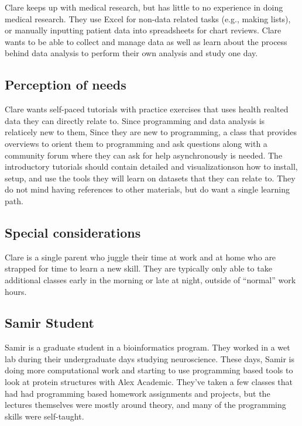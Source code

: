 \documentclass[020-persona\_validation.tex]{subfiles}
\begin{document}
            Clare keeps up with medical research,
            but has little to no experience in doing medical research.
            They use Excel for non-data related tasks (e.g., making lists),
            or manually inputting patient data into spreadsheets for chart reviews.
            Clare wants to be able to collect and manage data as well as
            learn about the process behind data analysis to perform their own analysis and study one day.

        \subsection{Perception of needs}

            Clare wants self-paced tutorials with practice exercises that uses health realted data they can directly relate to.            Since programming and data analysis is relaticely new to them,
            Since they are new to programming,
            a class that provides overviews to orient them to programming and ask questions along with
            a community forum where they can ask for help asynchronously is needed.
            The introductory tutorials should contain detailed and visualizationson how to install, setup, and use
            the tools they will learn on datasets that they can relate to.
            They do not mind having references to other materials,
            but do want a single learning path.

        \subsection{Special considerations}

            Clare is a single parent who juggle their time at work and at home who are strapped for time to learn a new skill.
            They are typically only able to take additional classes early in the morning or late at night,
            outside of ``normal'' work hours.

    \subsection{Samir Student}

        Samir is a graduate student in a bioinformatics program.
        They worked in a wet lab during their undergraduate days studying neuroscience.
        These days, Samir is doing more computational work and
        starting to use programming based tools to look at protein structures with Alex Academic.
        They've taken a few classes that had had programming based homework assignments and projects,
        but the lectures themselves were mostly around theory, and many of the programming skills were self-taught.
\end{document}
